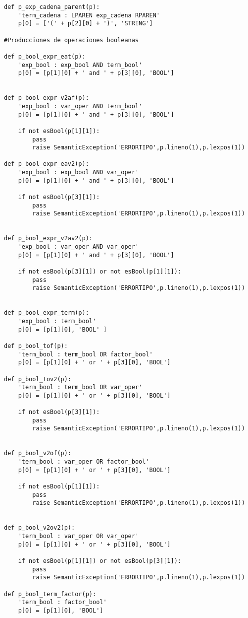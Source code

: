 \begin{verbatim}
def p_exp_cadena_parent(p):
    'term_cadena : LPAREN exp_cadena RPAREN'
    p[0] = ['(' + p[2][0] + ')', 'STRING']

#Producciones de operaciones booleanas

def p_bool_expr_eat(p):
    'exp_bool : exp_bool AND term_bool'
    p[0] = [p[1][0] + ' and ' + p[3][0], 'BOOL']


def p_bool_expr_v2af(p):
    'exp_bool : var_oper AND term_bool'
    p[0] = [p[1][0] + ' and ' + p[3][0], 'BOOL']

    if not esBool(p[1][1]):
        pass
        raise SemanticException('ERRORTIPO',p.lineno(1),p.lexpos(1))

def p_bool_expr_eav2(p):
    'exp_bool : exp_bool AND var_oper'
    p[0] = [p[1][0] + ' and ' + p[3][0], 'BOOL']

    if not esBool(p[3][1]):
        pass
        raise SemanticException('ERRORTIPO',p.lineno(1),p.lexpos(1))


def p_bool_expr_v2av2(p):
    'exp_bool : var_oper AND var_oper'
    p[0] = [p[1][0] + ' and ' + p[3][0], 'BOOL']

    if not esBool(p[3][1]) or not esBool(p[1][1]):
        pass
        raise SemanticException('ERRORTIPO',p.lineno(1),p.lexpos(1))


def p_bool_expr_term(p):
    'exp_bool : term_bool'
    p[0] = [p[1][0], 'BOOL' ]

def p_bool_tof(p):
    'term_bool : term_bool OR factor_bool'
    p[0] = [p[1][0] + ' or ' + p[3][0], 'BOOL']

def p_bool_tov2(p):
    'term_bool : term_bool OR var_oper'
    p[0] = [p[1][0] + ' or ' + p[3][0], 'BOOL']

    if not esBool(p[3][1]):
        pass
        raise SemanticException('ERRORTIPO',p.lineno(1),p.lexpos(1))


def p_bool_v2of(p):
    'term_bool : var_oper OR factor_bool'
    p[0] = [p[1][0] + ' or ' + p[3][0], 'BOOL']

    if not esBool(p[1][1]):
        pass
        raise SemanticException('ERRORTIPO',p.lineno(1),p.lexpos(1))


def p_bool_v2ov2(p):
    'term_bool : var_oper OR var_oper'
    p[0] = [p[1][0] + ' or ' + p[3][0], 'BOOL']

    if not esBool(p[1][1]) or not esBool(p[3][1]):
        pass
        raise SemanticException('ERRORTIPO',p.lineno(1),p.lexpos(1))

def p_bool_term_factor(p):
    'term_bool : factor_bool'
    p[0] = [p[1][0], 'BOOL'] 


\end{verbatim}
